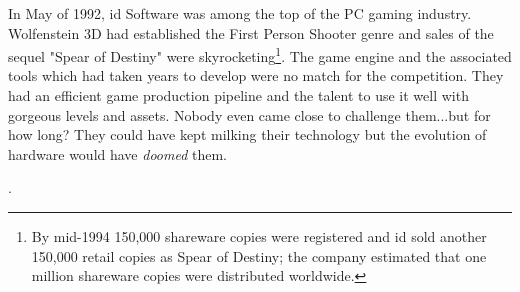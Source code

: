 In May of 1992, id Software was among the top of the PC gaming industry. Wolfenstein 3D had established the First
Person Shooter genre and sales of the sequel "Spear of Destiny" were skyrocketing\footnote{By mid-1994 150,000 shareware copies were registered and id sold another 150,000 retail copies as Spear of Destiny; the company estimated that one million shareware copies were distributed worldwide.}. The game engine and the associated 
tools which had taken years to develop were no match for the competition. They had an efficient game production pipeline and the talent to use it well with gorgeous levels and assets. Nobody even came close to challenge them...but for how long? They could have kept milking their technology but the evolution of hardware would have \textit{doomed} them.\\
\par

\par
{}. \\
\par


